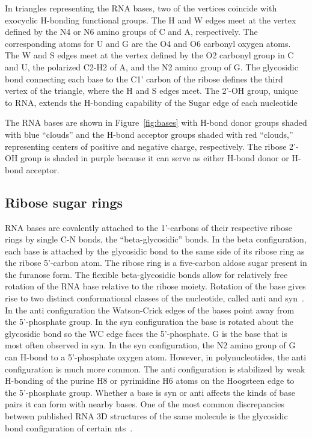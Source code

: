 In triangles representing the RNA bases, two of the vertices coincide with
exocyclic H-bonding functional groups. The H and W edges meet at the vertex
defined by the N4 or N6 amino groups of C and A, respectively. The corresponding
atoms for U and G are the O4 and O6 carbonyl oxygen atoms. The W and S edges
meet at the vertex defined by the O2 carbonyl group in C and U, the polarized
C2-H2 of A, and the N2 amino group of G\@. The glycosidic bond connecting each
base to the C1’ carbon of the ribose defines the third vertex of the triangle,
where the H and S edges meet. The 2'-OH group, unique to RNA, extends the
H-bonding capability of the Sugar edge of each nucleotide

The RNA bases are shown in Figure~\ref{fig:bases} with H-bond donor groups
shaded with blue ``clouds'' and the H-bond acceptor groups shaded with red
``clouds,'' representing centers of positive and negative charge, respectively.
The ribose 2'-OH group is shaded in purple because it can serve as either H-bond
donor or H-bond acceptor. 

\subsection{Ribose sugar rings}

RNA bases are covalently attached to the 1'-carbons of their respective ribose
rings by single C-N bonds, the ``beta-glycosidic'' bonds. In the beta
configuration, each base is attached by the glycosidic bond to the same side of
its ribose ring as the ribose 5'-carbon atom. The ribose ring is a five-carbon
aldose sugar present in the furanose form. The flexible beta-glycosidic bonds
allow for relatively free rotation of the RNA base relative to the ribose
moiety. Rotation of the base gives rise to two distinct conformational classes
of the nucleotide, called anti and syn~\cite{Neidle2008}. In the anti
configuration the Watson-Crick edges of the bases point away from the
5’-phosphate group. In the syn configuration the base is rotated \degree
about the glycosidic bond so the WC edge faces the 5'-phosphate. G is the base
that is most often observed in syn. In the syn configuration, the N2 amino group
of G can H-bond to a 5'-phosphate oxygen atom. However, in polynucleotides, the
anti configuration is much more common. The anti configuration is stabilized by
weak H-bonding of the purine H8 or pyrimidine H6 atoms on the Hoogsteen edge to
the 5'-phosphate group. Whether a base is syn or anti affects the kinds of base
pairs it can form with nearby bases. One of the most common discrepancies
between published RNA 3D structures of the same molecule is the glycosidic bond
configuration of certain nts~\cite{Leontis2002f}. 

